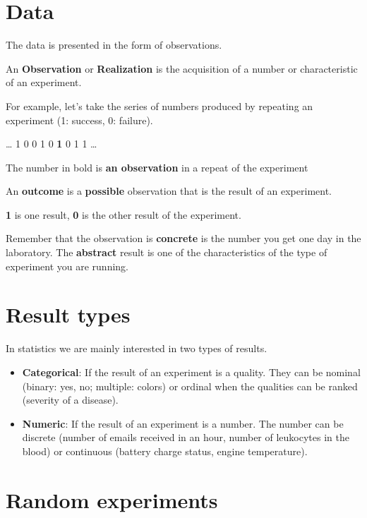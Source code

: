 \documentclass[
]{book}
\begin{document}
\hypertarget{data}{%
\section{Data}\label{data}}

The data is presented in the form of observations.

An \textbf{Observation} or \textbf{Realization} is the acquisition of a number or characteristic of an experiment.

For example, let's take the series of numbers produced by repeating an experiment (1: success, 0: failure).

\ldots{} 1 0 0 1 0 \textbf{1} 0 1 1 \ldots{}

The number in bold is \textbf{an observation} in a repeat of the experiment

An \textbf{outcome} is a \textbf{possible} observation that is the result of an experiment.

\textbf{1} is one result, \textbf{0} is the other result of the experiment.

Remember that the observation is \textbf{concrete} is the number you get one day in the laboratory. The \textbf{abstract} result is one of the characteristics of the type of experiment you are running.

\hypertarget{result-types}{%
\section{Result types}\label{result-types}}

In statistics we are mainly interested in two types of results.

\begin{itemize}
\item
  \textbf{Categorical}: If the result of an experiment is a quality. They can be nominal (binary: yes, no; multiple: colors) or ordinal when the qualities can be ranked (severity of a disease).
\item
  \textbf{Numeric}: If the result of an experiment is a number. The number can be discrete (number of emails received in an hour, number of leukocytes in the blood) or continuous (battery charge status, engine temperature).
\end{itemize}

\hypertarget{random-experiments}{%
\section{Random experiments}\label{random-experiments}}
\end{document}
